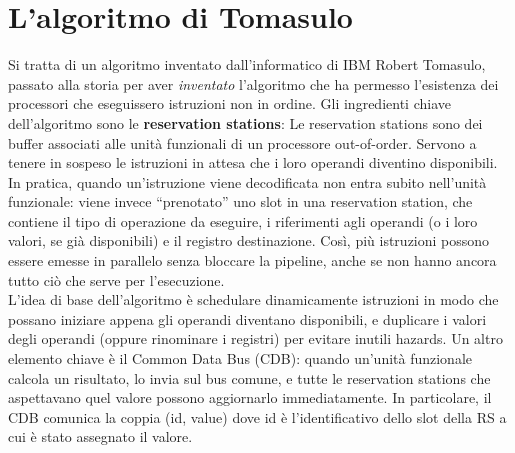 \section{L'algoritmo di Tomasulo}
Si tratta di un algoritmo inventato dall'informatico di IBM Robert Tomasulo, passato alla storia per aver \textit{inventato} l'algoritmo che ha permesso l'esistenza dei processori che eseguissero istruzioni non in ordine. 
Gli ingredienti chiave dell'algoritmo sono le \textbf{reservation stations}: Le reservation stations sono dei buffer associati alle unità funzionali di un processore out-of-order. Servono a tenere in sospeso le istruzioni in attesa che i loro operandi diventino disponibili. In pratica, quando un'istruzione viene decodificata non entra subito nell'unità funzionale: viene invece “prenotato” uno slot in una reservation station, che contiene il tipo di operazione da eseguire, i riferimenti agli operandi (o i loro valori, se già disponibili) e il registro destinazione. Così, più istruzioni possono essere emesse in parallelo senza bloccare la pipeline, anche se non hanno ancora tutto ciò che serve per l'esecuzione.
\\ \noindent L'idea di base dell'algoritmo è schedulare dinamicamente istruzioni in modo che possano iniziare appena gli operandi diventano disponibili, e duplicare i valori degli operandi (oppure rinominare i registri) per evitare inutili hazards. Un altro elemento chiave è il Common Data Bus (CDB): quando un'unità funzionale calcola un risultato, lo invia sul bus comune, e tutte le reservation stations che aspettavano quel valore possono aggiornarlo immediatamente. In particolare, il CDB comunica la coppia (id, value) dove id è l'identificativo dello slot della RS a cui è stato assegnato il valore. 

\begin{figure}[ht]
    \centering
    \setlength{\fboxrule}{0.5pt} %
    \setlength{\fboxsep}{0pt}    %
\end{figure}


